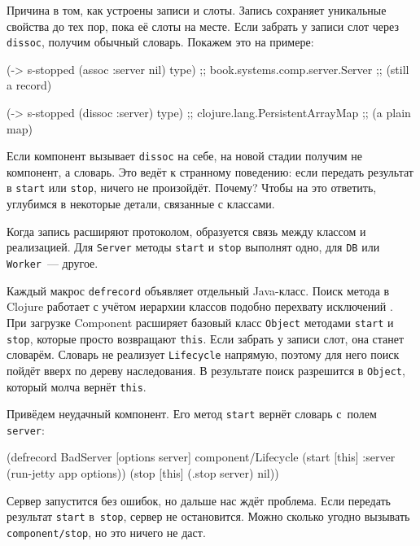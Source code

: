 \fi

Причина в том, как устроены записи и слоты. Запись сохраняет уникальные свойства
до тех пор, пока её слоты на месте. Если забрать у записи слот через
\verb|dissoc|, получим обычный словарь. Покажем это на примере:

\begin{english}
  \begin{clojure}
(-> s-stopped
    (assoc :server nil)
    type)
;; book.systems.comp.server.Server
;; (still a record)

(-> s-stopped
    (dissoc :server)
    type)
;; clojure.lang.PersistentArrayMap
;; (a plain map)
  \end{clojure}
\end{english}

Если компонент вызывает \verb|dissoc| на себе, на новой стадии получим не
компонент, а словарь. Это ведёт к странному поведению: если передать результат в
\verb|start| или \verb|stop|, ничего не произойдёт. Почему? Чтобы на это
ответить, углубимся в некоторые детали, связанные с классами.

Когда запись расширяют протоколом, образуется связь между классом и
реализацией. Для \verb|Server| методы \verb|start| и \verb|stop| выполнят
одно, для \verb|DB| или \verb|Worker|~--- другое.

Каждый макрос \verb|defrecord| объявляет отдельный Java-класс. Поиск метода в
Clojure работает с учётом иерархии классов подобно перехвату
исключений . При загрузке Component расширяет базовый класс
\verb|Object| методами \verb|start| и \verb|stop|, которые просто возвращают
\verb|this|. Если забрать у записи слот, она станет словарём. Словарь не
реализует \verb|Lifecycle| напрямую, поэтому для него поиск пойдёт вверх по
дереву наследования. В результате поиск разрешится в \verb|Object|, который
молча вернёт \verb|this|.

Привёдем неудачный компонент. Его метод \verb|start| вернёт словарь с~полем
\verb|server|:

\begin{english}
  \begin{clojure}
(defrecord BadServer [options server]
  component/Lifecycle
  (start [this]
    {:server (run-jetty app options)})
  (stop [this]
    (.stop server)
    nil))
  \end{clojure}
\end{english}

Сервер запустится без ошибок, но дальше нас ждёт проблема. Если передать
результат \verb|start| в~\verb|stop|, сервер не остановится. Можно сколько
угодно вызывать \verb|component/stop|, но это ничего не даст.

